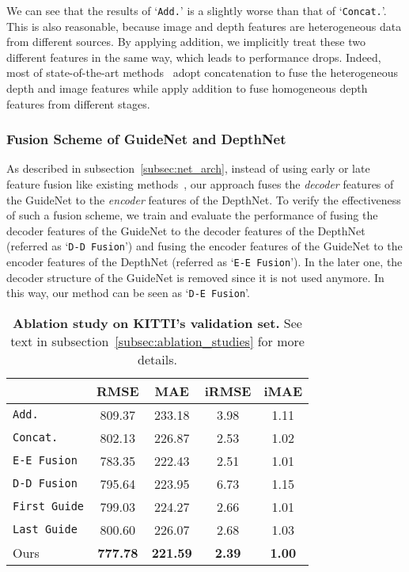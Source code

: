 \documentclass[journal]{IEEEtran}
\begin{document}
We can see that the results of `\texttt{Add.}' is a slightly worse than that of `\texttt{Concat.}'.
This is also reasonable, because image and depth features are heterogeneous data from different sources. 
By applying addition, we implicitly treat these two different features in the same way, which leads to performance drops.
Indeed, most of state-of-the-art methods~\cite{deep_lidar,self_supervised,cnn_confidence} adopt concatenation to
fuse the heterogeneous depth and image features while apply addition to fuse homogeneous depth features from different stages.


\subsubsection{Fusion Scheme of GuideNet and DepthNet}
As described in subsection~\ref{subsec:net_arch}, instead of using early or late feature fusion like existing methods~\cite{deep_lidar, sparse_noisy, self_supervised},
our approach fuses the \emph{decoder} features of the GuideNet to the \emph{encoder} features of the DepthNet.
To verify the effectiveness of such a fusion scheme,
we train and evaluate the performance of fusing the decoder features of the GuideNet to the decoder features of the DepthNet (referred as `\texttt{D-D Fusion}')
and fusing the encoder features of the GuideNet to the encoder features of the DepthNet (referred as `\texttt{E-E Fusion}').
In the later one, the decoder structure of the GuideNet is removed since it is not used anymore.
In this way, our method can be seen as `\texttt{D-E Fusion}'.



\begin{table}
   \caption{{\bf Ablation study on KITTI's validation set.} See text in subsection~\ref{subsec:ablation_studies} for more details.} \label{tab:ablation} 
   \begin{center}
   \small
   \begin{tabular}{l|c|c|c|c} \hline
    & \textbf{RMSE}   & MAE   & iRMSE & iMAE \\ \hline
   \texttt{Add.} & 809.37 & 233.18 & 3.98 & 1.11 \\
   \texttt{Concat.} & 802.13 & 226.87 & 2.53 & 1.02 \\
   \texttt{E-E Fusion} & 783.35 & 222.43 & 2.51 & 1.01 \\
   \texttt{D-D Fusion} & 795.64 & 223.95 & 6.73 & 1.15 \\
   \texttt{First Guide} & 799.03 & 224.27 & 2.66 & 1.01 \\
   \texttt{Last Guide} & 800.60 & 226.07 & 2.68 & 1.03 \\  \hline
   Ours & \textbf{777.78} & \textbf{221.59} & \textbf{2.39} & \textbf{1.00} \\ \hline
   \end{tabular}
   \end{center}
   
\end{table}
\end{document}
